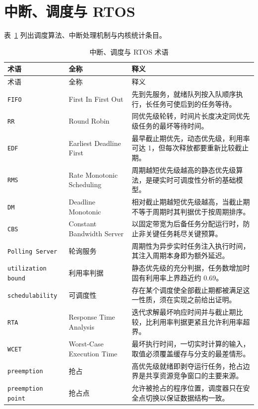 \documentclass[12pt,a4paper,fontset=fandol]{ctexbook}
\newcommand{\Tp}[1]{\texttt{#1}}
\begin{document}
\section{中断、调度与 RTOS}

表~\ref{tab:apA-rtos} 列出调度算法、中断处理机制与内核统计条目。

\begin{longtable}{@{} >{\raggedright\arraybackslash}p{} >{\raggedright\arraybackslash}p{} >{\raggedright\arraybackslash}p{}@{}}
\caption{中断、调度与 RTOS 术语}\label{tab:apA-rtos} \\
\toprule
术语 & 全称 & 释义 \\
\midrule
\endfirsthead
\toprule
术语 & 全称 & 释义 \\
\midrule
\endhead
\bottomrule
\endfoot
\endlastfoot
\Tp{FIFO} & First In First Out & 先到先服务，就绪队列按入队顺序执行，长任务可使后到的任务等待。 \\
\Tp{RR} & Round Robin & 同优先级轮转，时间片长度决定同优先级任务的最坏等待时间。 \\
\Tp{EDF} & Earliest Deadline First & 最早截止期优先，动态优先级，利用率可达 1，但每次释放都要重新比较截止期。 \\
\Tp{RMS} & Rate Monotonic Scheduling & 周期越短优先级越高的静态优先级算法，是硬实时可调度性分析的基础模型。 \\
\Tp{DM} & Deadline Monotonic & 相对截止期越短优先级越高，当截止期不等于周期时其判据优于按周期排序。 \\
\Tp{CBS} & Constant Bandwidth Server & 以固定带宽为后备任务分配运行时，防止非关键任务耗尽关键预算。 \\
\Tp{Polling Server} & 轮询服务 & 周期性为异步实时任务注入执行时间，其注入周期本身即为额外延迟。 \\
\Tp{utilization bound} & 利用率判据 & 静态优先级的充分判据，任务数增加时固有利用率上界趋近约 0.69。 \\
\Tp{schedulability} & 可调度性 & 存在某个调度使全部截止期都被满足这一性质，须在实现之前给出证明。 \\
\Tp{RTA} & Response Time Analysis & 迭代求解最坏响应时间并与截止期比较，比利用率判据更紧且允许利用率超界。 \\
\Tp{WCET} & Worst-Case Execution Time & 最坏执行时间，一切实时计算的输入，取值必须覆盖缓存与分支的最差情形。 \\
\Tp{preemption} & 抢占 & 高优先级就绪即剥夺运行任务，抢占边界是共享资源竞争窗口的主要来源。 \\
\Tp{preemption point} & 抢占点 & 允许被抢占的程序位置，调度器只在安全点切换以保证数据结构一致。 \\

\end{longtable}
\end{document}
